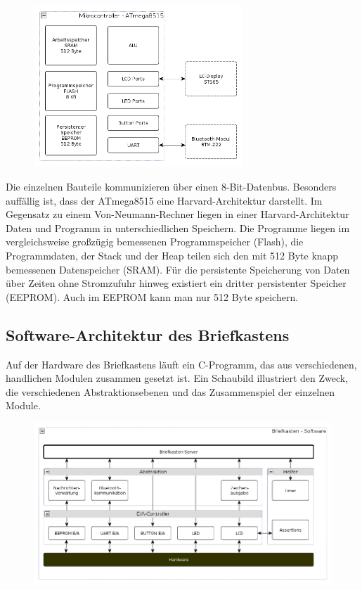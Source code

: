 \documentclass[ngerman]{article}
\begin{document}
\begin{figure}[h!] \begin{center}
    \includegraphics[width=0.7\textwidth]{media/letterbox-atmega-arch}
\end{center} \end{figure}

Die einzelnen Bauteile kommunizieren über einen 8-Bit-Datenbus. Besonders
auffällig ist, dass der ATmega8515 eine Harvard-Architektur darstellt. Im
Gegensatz zu einem Von-Neumann-Rechner liegen in einer Harvard-Architektur
Daten und Programm in unterschiedlichen Speichern. Die Programme liegen im
vergleichsweise großzügig bemessenen Programmspeicher (Flash), die
Programmdaten, der Stack und der Heap teilen sich den mit 512 Byte knapp
bemessenen Datenspeicher (SRAM). Für die persistente Speicherung von Daten über
Zeiten ohne Stromzufuhr hinweg existiert ein dritter persistenter Speicher
(EEPROM). Auch im EEPROM kann man nur 512 Byte speichern.


\subsection{Software-Architektur des Briefkastens}

Auf der Hardware des Briefkastens läuft ein C-Programm, das aus verschiedenen,
handlichen Modulen zusammen gesetzt ist. Ein Schaubild illustriert den Zweck,
die verschiedenen Abstraktionsebenen und das Zusammenspiel der einzelnen
Module.

\begin{figure}[h!] \begin{center}
    \includegraphics[width=\textwidth]{media/letterbox-arch}
\end{center} \end{figure}
\end{document}
